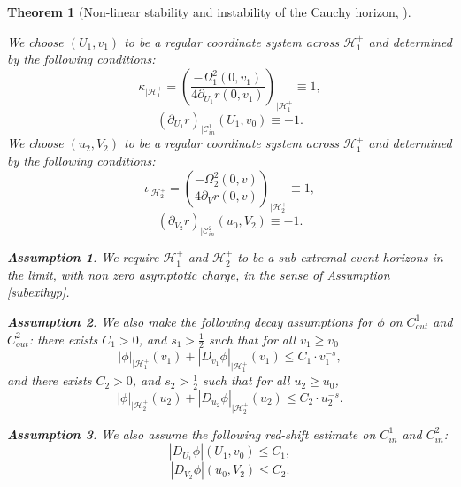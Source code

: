 \documentclass[10pt,a4paper]{article}
\theoremstyle{plain}
\newtheorem{thm}{Theorem}[section]
\theoremstyle{remark}
\theoremstyle{definition}
\newtheorem{hyp}{Assumption}
\theoremstyle{plain}
\theoremstyle{remark}
\theoremstyle{definition}
\numberwithin{equation}{section}
\begin{document}
\begin{thm}[Non-linear stability and instability of the Cauchy horizon, \cite{Moi}]
\begin{enumerate}
		We choose $(U_1,v_1)$ to be a regular coordinate  system across $\mathcal{H}_1^+$ and determined by the following conditions: 	\begin{equation} 
		\kappa_{|\mathcal{H}^+_1} = (\frac{-\Omega^2_{1}(0,v_1)}{4\partial_{U_1}r(0, v_1)})_{|\mathcal{H}^+_1}\equiv 1,
		\end{equation}    \begin{equation}
		(\partial_{U_1}r)_{|\mathcal{C}_{in}^1}(U_1, v_0) \equiv -1.
		\end{equation}   	We choose $(u_2,V_2)$ to be a regular coordinate  system across $\mathcal{H}_1^+$ and determined by the following conditions: 	\begin{equation} 
		\iota_{|\mathcal{H}^+_2} = (\frac{-\Omega^2_{2}(0,v)}{4\partial_{V}r(0, v)})_{|\mathcal{H}^+_2}\equiv 1,
		\end{equation}    \begin{equation}
		(\partial_{V_2}r)_{|\mathcal{C}_{in}^2}(u_0, V_2) \equiv -1.
		\end{equation}
		
		
		
		
		
		\begin{hyp}	We require $\mathcal{H}^+_1$ and $\mathcal{H}^+_2$ to be a sub-extremal event horizons in the limit, with non zero asymptotic charge, in the sense of Assumption \ref{subexthyp}. 	
		\end{hyp}
		
		
		
		\begin{hyp} 	 We also make the following decay assumptions for $\phi$ on $C_{out}^1$ and $C_{out}^2$:  there exists $ C_1>0$, and $s_1>\frac{1}{2}$ such that for all $v_1\geq v_0$
			$$|\phi|_{|\mathcal{H}^+_1}(v_1) +| D_{v_1} \phi|_{|\mathcal{H}^+_1}(v_1) \leq  C_1 \cdot v_1^{-s},$$ and there exists $ C_2>0$, and $s_2>\frac{1}{2}$ such that for all $u_2\geq u_0$,
			$$|\phi|_{|\mathcal{H}^+_2}(u_2) +| D_{u_2} \phi|_{|\mathcal{H}^+_2}(u_2) \leq  C_2 \cdot u_2^{-s}.$$
		\end{hyp}
		
		\begin{hyp} We also assume the following red-shift estimate on $C_{in}^1$ and $C_{in}^2$: 
			$$| D_{U_1} \phi| (U_1, v_0) \leq C_1,$$  		   	$$| D_{V_2} \phi| (u_0, V_2) \leq C_2.$$ 
			
			
		\end{hyp}
		
		
		

\end{enumerate}
\end{thm}
\end{document}
